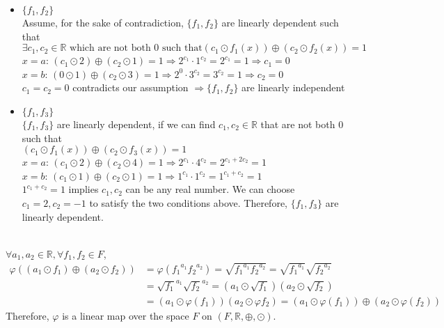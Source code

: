 \documentclass[a4paper,10.5pt]{article}
\newcommand{\R}{\mathbb{R}}
\begin{document}

\begin{itemize}
	\item $\{f_1,f_2\}$ \\
	Assume, for the sake of contradiction, $\{f_1,f_2\}$ are linearly dependent such that \\
	$\exists c_1 ,c_2 \in \R \text{ which are not both 0 such that} \left( c_1 \odot f_1(x) \right) \oplus \left( c_2 \odot f_2(x) \right) = 1$ \\
	$x = a$: $\left( c_1 \odot 2 \right) \oplus \left( c_2 \odot 1 \right) = 1 \Rightarrow 2^{c_1} \cdot 1^{c_2} = 2^{c_1} = 1 \Rightarrow c_1 = 0$ \\
	$x = b$: $\left( 0 \odot 1 \right) \oplus \left( c_2 \odot 3 \right) = 1 \Rightarrow 2^{0} \cdot 3^{c_2} = 3^{c_2} = 1 \Rightarrow c_2 = 0$ \\
	$c_1 = c_2 = 0$ contradicts our assumption $\Rightarrow \{f_1, f_2\}$ are linearly independent
	\item $\{f_1,f_3\}$ \\
	$\{f_1,f_3\}$ are linearly dependent, if we can find $c_1 ,c_2 \in \R$ that are not both $0$ such that \\
	$\left( c_1 \odot f_1(x) \right) \oplus \left( c_2 \odot f_3(x) \right) = 1$ \\
	$x = a$: $\left( c_1 \odot 2 \right) \oplus \left( c_2 \odot 4 \right) = 1 \Rightarrow 2^{c_1} \cdot 4^{c_2} = 2^{c_1 + 2 c_2} = 1$ \\
	$x = b$: $\left( c_1 \odot 1 \right) \oplus \left( c_2 \odot 1 \right) = 1 \Rightarrow 1^{c_1} \cdot 1^{c_2} = 1^{c_1 + c_2} = 1$ \\
	$1^{c_1 + c_2} = 1$ implies $c_1, c_2$ can be any real number. We can choose $c_1 = 2, c_2 = -1$ to satisfy the two conditions above. Therefore, $\{f_1,f_3\}$ are linearly dependent.
\end{itemize}

 \\

$\forall a_1, a_2 \in \R, \forall f_1, f_2 \in F$, 
\begin{align*}
\varphi\left((a_1 \odot f_1) \oplus (a_2 \odot f_2) \right) 
&= \varphi({f_1}^{a_1}{f_2}^{a_2}) = \sqrt{{f_1}^{a_1}{f_2}^{a_2}} = \sqrt{{f_1}^{a_1}}\sqrt{{f_2}^{a_2}} \\ 
&= {\sqrt{f_1}}^{a_1}{\sqrt{f_2}}^{a_2} = \left(a_1 \odot \sqrt{f_1}\right)\left(a_2 \odot \sqrt{f_2}\right) \\
&= \left(a_1 \odot \varphi(f_1)\right)\left(a_2 \odot \varphi{f_2} \right)= \left(a_1 \odot \varphi(f_1)\right) \oplus \left(a_2 \odot \varphi(f_2)\right)
\end{align*}
Therefore, $\varphi$ is a linear map over the space $F$ on $(F, \mathbb{R}, \oplus, \odot)$.
\end{document}
